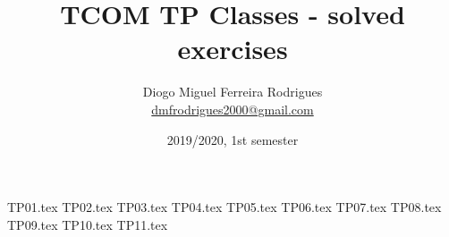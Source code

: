 \documentclass[a4paper]{article}
\title{TCOM TP Classes - solved exercises}
\author{Diogo Miguel Ferreira Rodrigues \\ \href{mailto:dmfrodrigues2000@gmail.com}{dmfrodrigues2000@gmail.com}}
\date{2019/2020, 1st semester}
\begin{document}
\begingroup
	\maketitle
	\let\clearpage\relax
	\setcounter{tocdepth}{2}
	\tableofcontents
\endgroup
{TP01.tex}
{TP02.tex}
{TP03.tex}
{TP04.tex}
{TP05.tex}
{TP06.tex}
{TP07.tex}
{TP08.tex}
{TP09.tex}
{TP10.tex}
{TP11.tex}
\end{document}
